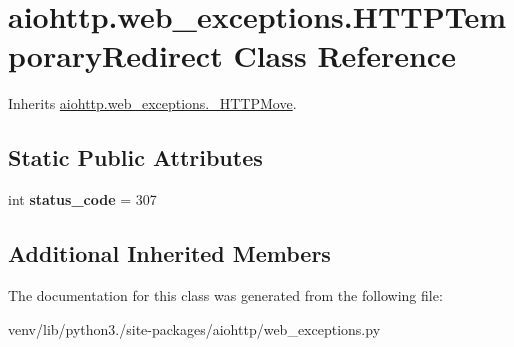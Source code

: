\hypertarget{classaiohttp_1_1web__exceptions_1_1_h_t_t_p_temporary_redirect}{}\section{aiohttp.\+web\+\_\+exceptions.\+H\+T\+T\+P\+Temporary\+Redirect Class Reference}
\label{classaiohttp_1_1web__exceptions_1_1_h_t_t_p_temporary_redirect}


Inherits \hyperlink{classaiohttp_1_1web__exceptions_1_1___h_t_t_p_move}{aiohttp.\+web\+\_\+exceptions.\+\_\+\+H\+T\+T\+P\+Move}.

\subsection*{Static Public Attributes}
\begin{DoxyCompactItemize}
\item 
\mbox{\label{classaiohttp_1_1web__exceptions_1_1_h_t_t_p_temporary_redirect_a0c545bd64ad2a150cdcb86f3833989ec}} 
int {\bfseries status\+\_\+code} = 307
\end{DoxyCompactItemize}
\subsection*{Additional Inherited Members}


The documentation for this class was generated from the following file\+:\begin{DoxyCompactItemize}
\item 
venv/lib/python3./site-\/packages/aiohttp/web\+\_\+exceptions.\+py\end{DoxyCompactItemize}
